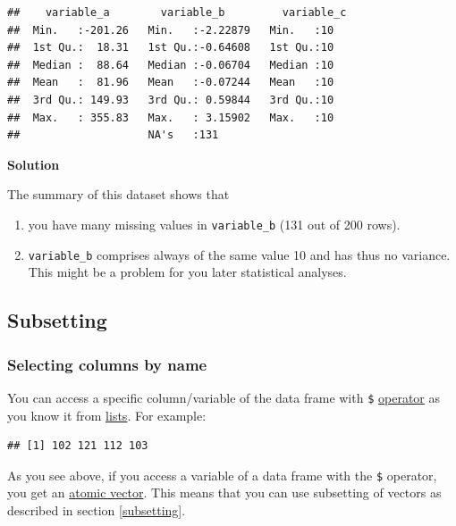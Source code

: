\documentclass[
]{scrartcl}
\newenvironment{Shaded}{\begin{snugshade}}{\end{snugshade}}
\newcommand{\NormalTok}[1]{#1}
\newcommand{\SpecialCharTok}[1]{\textcolor[rgb]{0.81,0.36,0.00}{\textbf{#1}}}
\providecommand{\tightlist}{%
  \setlength{\itemsep}{0pt}\setlength{\parskip}{0pt}}
\newenvironment{webexsolution}[1]
    {\par\tiny\textbf{#1}}
    {\par}
\newcommand{\webexhide}[1]{\begin{webexsolution}{#1}}
\newcommand{\webexunhide}{\end{webexsolution}}
\begin{document}
\begin{verbatim}
##    variable_a        variable_b         variable_c
##  Min.   :-201.26   Min.   :-2.22879   Min.   :10  
##  1st Qu.:  18.31   1st Qu.:-0.64608   1st Qu.:10  
##  Median :  88.64   Median :-0.06704   Median :10  
##  Mean   :  81.96   Mean   :-0.07244   Mean   :10  
##  3rd Qu.: 149.93   3rd Qu.: 0.59844   3rd Qu.:10  
##  Max.   : 355.83   Max.   : 3.15902   Max.   :10  
##                    NA's   :131
\end{verbatim}

\webexhide{Solution}

The summary of this dataset shows that

\begin{enumerate}
\def\labelenumi{\arabic{enumi}.}
\tightlist
\item
  you have many missing values in \texttt{variable\_b} (131 out of 200 rows).
\item
  \texttt{variable\_b} comprises always of the same value 10 and has thus no variance. This might be a problem for you later statistical analyses.
\end{enumerate}

\webexunhide

\subsection{Subsetting}\label{nolabel}

\subsubsection{Selecting columns by name}\label{selectbyname}

You can access a specific column/variable of the data frame with \texttt{\$} \hyperref[listsdollar]{operator} as you know it from \hyperref[lists]{lists}. For example:

\begin{Shaded}
\end{Shaded}

\begin{verbatim}
## [1] 102 121 112 103
\end{verbatim}

As you see above, if you access a variable of a data frame with the \texttt{\$} operator, you get an \hyperref[vectors]{atomic vector}. This means that you can use subsetting of vectors as described in section \ref{subsetting}.
\end{document}
